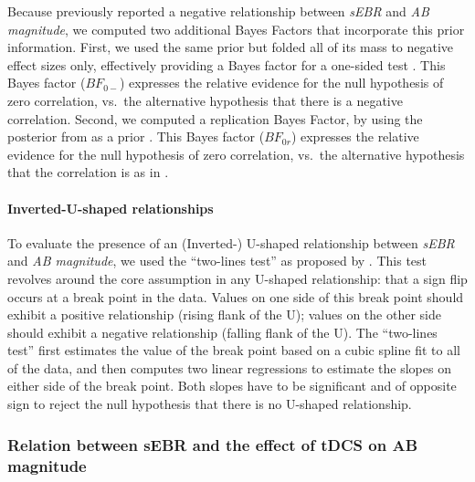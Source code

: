 \documentclass[11pt,english,]{memoir}
\let\oldparagraph\paragraph
\renewcommand{\paragraph}[1]{\oldparagraph{#1}\mbox{}}
\begin{document}
Because \textcite{Colzato2008} previously reported a negative relationship between \emph{sEBR} and \emph{AB magnitude}, we computed two additional Bayes Factors that incorporate this prior information. First, we used the same prior but folded all of its mass to negative effect sizes only, effectively providing a Bayes factor for a one-sided test \autocite{Wagenmakers2016}. This Bayes factor (\(BF_{0-}\)) expresses the relative evidence for the null hypothesis of zero correlation, vs.~the alternative hypothesis that there is a negative correlation. Second, we computed a replication Bayes Factor, by using the posterior from \textcite{Colzato2008} as a prior \autocites{Verhagen2014}{Wagenmakers2016}. This Bayes factor (\(BF_{0r}\)) expresses the relative evidence for the null hypothesis of zero correlation, vs.~the alternative hypothesis that the correlation is as in \textcite{Colzato2008}.

\hypertarget{inverted-u-shaped-relationships}{%
\paragraph{Inverted-U-shaped relationships}\label{inverted-u-shaped-relationships}}

To evaluate the presence of an (Inverted-) U-shaped relationship between \emph{sEBR} and \emph{AB magnitude}, we used the ``two-lines test'' as proposed by \textcite{Simonsohn2018}. This test revolves around the core assumption in any U-shaped relationship: that a sign flip occurs at a break point in the data. Values on one side of this break point should exhibit a positive relationship (rising flank of the U); values on the other side should exhibit a negative relationship (falling flank of the U). The ``two-lines test'' first estimates the value of the break point based on a cubic spline fit to all of the data, and then computes two linear regressions to estimate the slopes on either side of the break point. Both slopes have to be significant and of opposite sign to reject the null hypothesis that there is no U-shaped relationship.

\hypertarget{relation-between-sebr-and-the-effect-of-tdcs-on-ab-magnitude}{%
\subsubsection{Relation between sEBR and the effect of tDCS on AB magnitude}\label{relation-between-sebr-and-the-effect-of-tdcs-on-ab-magnitude}}
\end{document}
